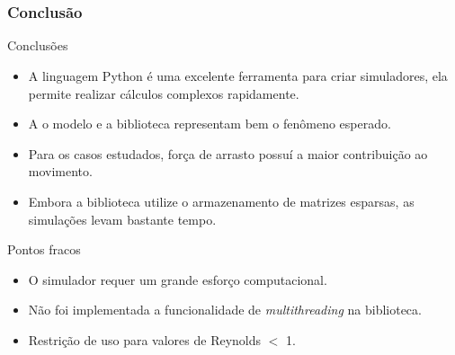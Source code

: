 \documentclass{beamer}
\begin{document}
\section*{}
\begin{frame}
  \frametitle{Conclusão}
  
  \centering
  \fontsize{10pt}{7.2}\selectfont
  \begin{block}{Conclusões}
    \begin{itemize}
      \item A linguagem Python é uma excelente ferramenta para criar simuladores, ela permite realizar cálculos complexos rapidamente.
      \item A o modelo e a biblioteca representam bem o fenômeno esperado.
      \item Para os casos estudados, força de arrasto possuí a maior contribuição ao movimento.
      \item Embora a biblioteca utilize o armazenamento de matrizes esparsas, as simulações levam bastante tempo.
    \end{itemize}
  \end{block}
  
  \begin{block}{Pontos fracos}
    \begin{itemize}
      \item O simulador requer um grande esforço computacional.
      \item Não foi implementada a funcionalidade de \textit{multithreading} na biblioteca.
      \item Restrição de uso para valores de Reynolds $<$ 1.
    \end{itemize}
  \end{block}
\end{frame}

\end{document}
